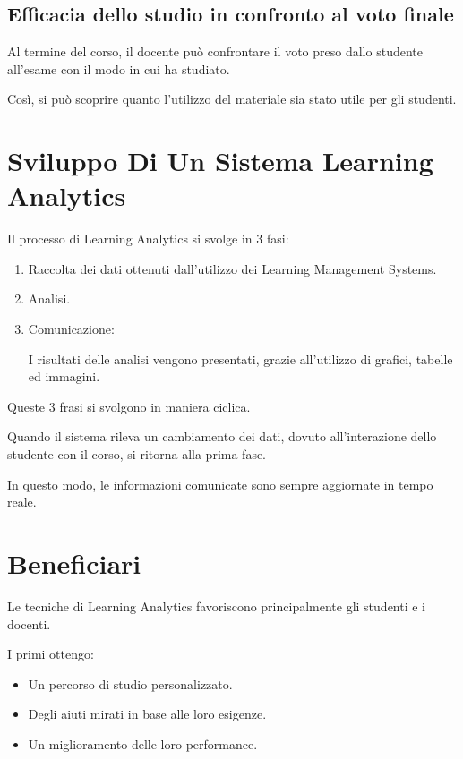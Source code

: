 \subsection{Efficacia dello studio in confronto al voto finale}

Al termine del corso, il docente può confrontare il voto preso dallo studente all'esame con il modo in cui ha studiato.

Così, si può scoprire quanto l'utilizzo del materiale sia stato utile per gli studenti.

\section{Sviluppo Di Un Sistema Learning Analytics}

Il processo di Learning Analytics si svolge in 3 fasi:

\begin{enumerate}

\item Raccolta dei dati ottenuti dall'utilizzo dei Learning Management Systems.
\item Analisi.
\item Comunicazione:

I risultati delle analisi vengono presentati, grazie all'utilizzo di grafici, tabelle ed immagini.

\end{enumerate}

Queste 3 frasi si svolgono in maniera ciclica.

Quando il sistema rileva un cambiamento dei dati, dovuto all'interazione dello studente con il corso, si ritorna alla prima fase.

In questo modo, le informazioni comunicate sono sempre aggiornate in tempo reale.

\cite{iadlearning1}

\section{Beneficiari}

Le tecniche di Learning Analytics favoriscono principalmente gli studenti e i docenti.

I primi ottengo:

\begin{itemize}

\item Un percorso di studio personalizzato.
\item Degli aiuti mirati in base alle loro esigenze.    
\item Un miglioramento delle loro performance.

\end{itemize}

